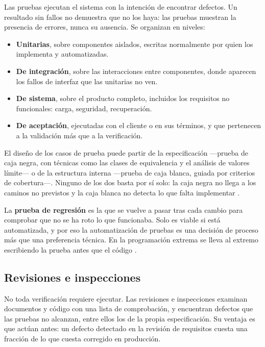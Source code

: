 Las pruebas ejecutan el sistema con la intención de encontrar defectos. Un
resultado sin fallos no demuestra que no los haya: las pruebas muestran la
presencia de errores, nunca su ausencia. Se organizan en niveles:

\begin{itemize}
    \item \textbf{Unitarias}, sobre componentes aislados, escritas normalmente por
          quien los implementa y automatizadas.
    \item \textbf{De integración}, sobre las interacciones entre componentes, donde
          aparecen los fallos de interfaz que las unitarias no ven.
    \item \textbf{De sistema}, sobre el producto completo, incluidos los requisitos
          no funcionales: carga, seguridad, recuperación.
    \item \textbf{De aceptación}, ejecutadas con el cliente o en sus términos, y
          que pertenecen a la validación más que a la verificación.
\end{itemize}

El diseño de los casos de prueba puede partir de la especificación —prueba de caja
negra, con técnicas como las clases de equivalencia y el análisis de valores
límite— o de la estructura interna —prueba de caja blanca, guiada por criterios de
cobertura—. Ninguno de los dos basta por sí solo: la caja negra no llega a los
caminos no previstos y la caja blanca no detecta lo que falta implementar
\cite{pfleeger2002}.

La \textbf{prueba de regresión} es la que se vuelve a pasar tras cada cambio para
comprobar que no se ha roto lo que funcionaba. Solo es viable si está
automatizada, y por eso la automatización de pruebas es una decisión de proceso
más que una preferencia técnica. En la programación extrema se lleva al extremo
escribiendo la prueba antes que el código \cite{beck2002}.

\subsection*{Revisiones e inspecciones}

No toda verificación requiere ejecutar. Las revisiones e inspecciones examinan
documentos y código con una lista de comprobación, y encuentran defectos que las
pruebas no alcanzan, entre ellos los de la propia especificación. Su ventaja es
que actúan antes: un defecto detectado en la revisión de requisitos cuesta una
fracción de lo que cuesta corregido en producción.

